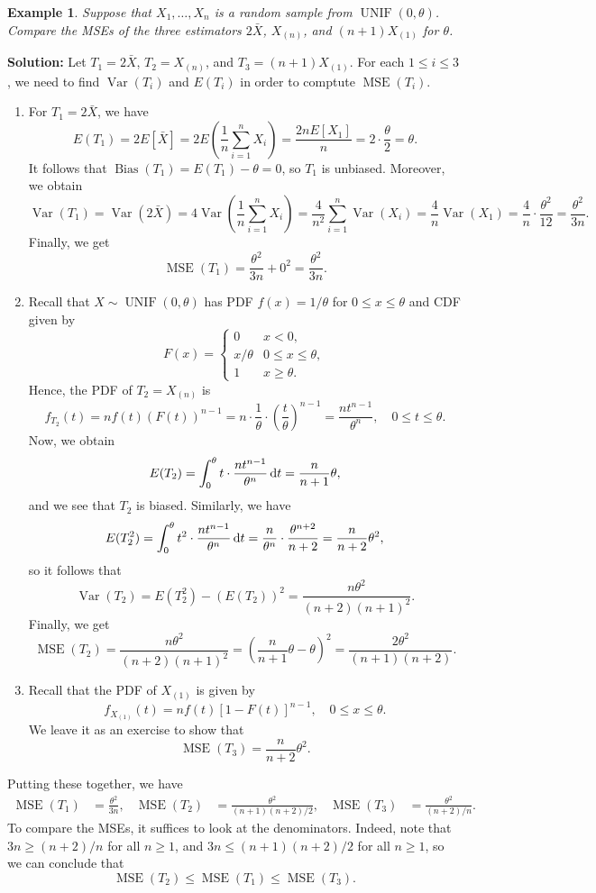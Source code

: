 \documentclass[10pt]{article}
\newcommand{\dd}{\,{\rm d}}
\DeclareMathOperator{\UNIF}{UNIF}
\DeclareMathOperator{\Var}{Var}
\DeclareMathOperator{\Bias}{Bias}
\DeclareMathOperator{\MSE}{MSE}
\theoremstyle{newstyle}
\newtheorem{exmp}[thm]{Example}
\begin{document}
\begin{exmp}
Suppose that $X_1, \dots, X_n$ is a random sample from $\UNIF(0, \theta)$. Compare the 
MSEs of the three estimators $2\bar{X}$, $X_{(n)}$, and $(n+1)X_{(1)}$ for $\theta$. 
\end{exmp}
{\color{blue}
{\bf Solution:} 
Let $T_1 = 2\bar{X}$, $T_2 = X_{(n)}$, and $T_3 = (n+1)X_{(1)}$. For each $1 \leq i \leq 3$, we need 
to find $\Var(T_i)$ and $E(T_i)$ in order to comptute $\MSE(T_i)$. 
\begin{enumerate}[(1)]
    \item For $T_1 = 2\bar{X}$, we have 
    \[ E(T_1) = 2E[\bar{X}] = 2E\left( \frac1n \sum_{i=1}^n X_i \right) = \frac{2n E[X_1]}n 
    = 2 \cdot \frac\theta2 = \theta. \]
    It follows that $\Bias(T_1) = E(T_1) - \theta = 0$, so $T_1$ is unbiased. Moreover, we obtain 
    \[ \Var(T_1) = \Var(2\bar{X}) = 4\Var\left(\frac1n \sum_{i=1}^n X_i \right) = 
    \frac4{n^2} \sum_{i=1}^n \Var(X_i) = \frac4n \Var(X_1) = \frac4n \cdot \frac{\theta^2}{12} = 
    \frac{\theta^2}{3n}. \]
    Finally, we get 
    \[ \MSE(T_1) = \frac{\theta^2}{3n} + 0^2 = \frac{\theta^2}{3n}. \]
    \item Recall that $X \sim \UNIF(0, \theta)$ has PDF $f(x) = 1/\theta$ for $0 \leq x \leq \theta$ 
    and CDF given by 
    \[ F(x) = \begin{cases} 0 & x < 0, \\ x/\theta & 0 \leq x \leq \theta, \\ 1 & x \geq \theta.
    \end{cases} \]
    Hence, the PDF of $T_2 = X_{(n)}$ is 
    \[ f_{T_2}(t) = nf(t)(F(t))^{n-1} = n \cdot \frac1\theta \cdot \left( \frac t\theta\right)^{n-1}
    = \frac{nt^{n-1}}{\theta^n}, \quad 0 \leq t \leq \theta. \]
    Now, we obtain 
    \[ E(T_2) = \int_0^\theta t \cdot \frac{nt^{n-1}}{\theta^n}\dd t = \frac{n}{n+1}\theta, \]
    and we see that $T_2$ is biased. Similarly, we have 
    \[ E(T_2^2) = \int_0^\theta t^2 \cdot \frac{nt^{n-1}}{\theta^n}\dd t = 
    \frac{n}{\theta^n} \cdot \frac{\theta^{n+2}}{n+2} = \frac{n}{n+2} \theta^2, \]
    so it follows that 
    \[ \Var(T_2) = E(T_2^2) - (E(T_2))^2 = \frac{n\theta^2}{(n+2)(n+1)^2}. \]
    Finally, we get 
    \[ \MSE(T_2) = \frac{n\theta^2}{(n+2)(n+1)^2} = \left( \frac{n}{n+1}\theta - \theta \right)^2 
    = \frac{2\theta^2}{(n+1)(n+2)}. \]
    \item Recall that the PDF of $X_{(1)}$ is given by 
    \[ f_{X_{(1)}}(t) = nf(t)[1 - F(t)]^{n-1}, \quad 0 \leq x \leq \theta. \]
    We leave it as an exercise to show that 
    \[ \MSE(T_3) = \frac{n}{n+2}\theta^2. \]
\end{enumerate}
Putting these together, we have 
\begin{align*}
    \MSE(T_1) &= \frac{\theta^2}{3n}, &
    \MSE(T_2) &= \frac{\theta^2}{(n+1)(n+2)/2}, &
    \MSE(T_3) &= \frac{\theta^2}{(n+2)/n}. 
\end{align*}
To compare the MSEs, it suffices to look at the denominators. Indeed, note that 
$3n \geq (n+2)/n$ for all $n \geq 1$, and $3n \leq (n+1)(n+2)/2$ for all $n \geq 1$, so 
we can conclude that 
\[ \MSE(T_2) \leq \MSE(T_1) \leq \MSE(T_3). \]}
\end{document}
